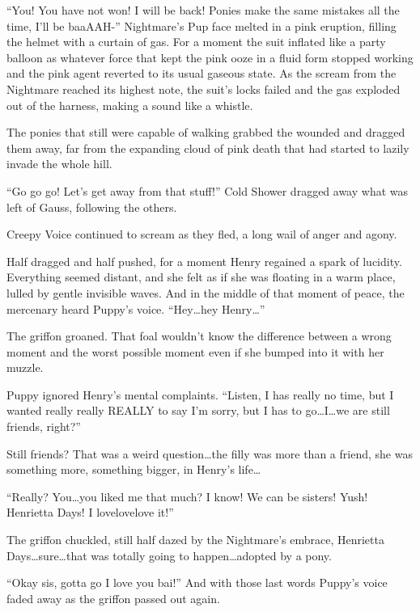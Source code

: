 ``You! You have not won! I will be back! Ponies make the same mistakes all the time, I'll be baaAAH-'' Nightmare's Pup face melted in a pink eruption, filling the helmet with a curtain of gas. For a moment the suit inflated like a party balloon as whatever force that kept the pink ooze in a fluid form stopped working and the pink agent reverted to its usual gaseous state. As the scream from the Nightmare reached its highest note, the suit's locks failed and the gas exploded out of the harness, making a sound like a whistle.

The ponies that still were capable of walking grabbed the wounded and dragged them away, far from the expanding cloud of pink death that had started to lazily invade the whole hill.

``Go go go! Let's get away from that stuff!'' Cold Shower dragged away what was left of Gauss, following the others.

Creepy Voice continued to scream as they fled, a long wail of anger and agony.

Half dragged and half pushed, for a moment Henry regained a spark of lucidity. Everything seemed distant, and she felt as if she was floating in a warm place, lulled by gentle invisible waves. And in the middle of that moment of peace, the mercenary heard Puppy's voice. ``Hey\dots hey Henry\dots''

The griffon groaned. That foal wouldn't know the difference between a wrong moment and the worst possible moment even if she bumped into it with her muzzle.

Puppy ignored Henry's mental complaints. ``Listen, I has really no time, but I wanted really really REALLY to say I'm sorry, but I has to go\dots I\dots we are still friends, right?''

Still friends? That was a weird question\dots the filly was more than a friend, she was something more, something bigger, in Henry's life\dots

``Really? You\dots you liked me that much? I know! We can be sisters! Yush! Henrietta Days! I lovelovelove it!''

The griffon chuckled, still half dazed by the Nightmare's embrace, Henrietta Days\dots sure\dots that was totally going to happen\dots adopted by a pony.

``Okay sis, gotta go I love you bai!'' And with those last words Puppy's voice faded away as the griffon passed out again.

\horizonline


